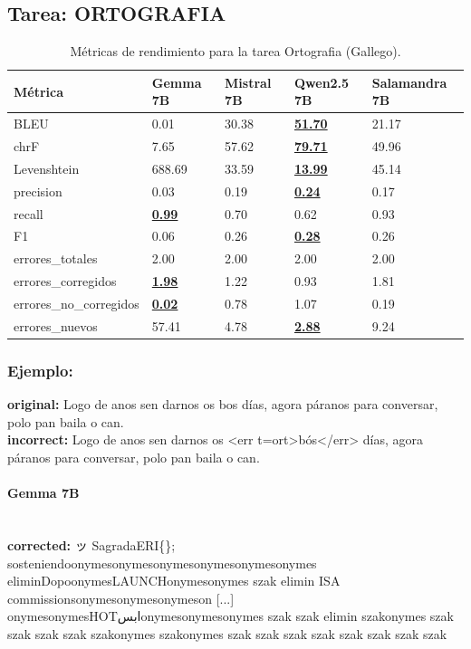 \subsection{Tarea: ORTOGRAFIA}\label{tarea-ortografia}
\begin{longtable}[]{@{}lllll@{}}
\toprule\noalign{}
Métrica & Gemma 7B & Mistral 7B & Qwen2.5 7B & Salamandra 7B \\
\midrule\noalign{}
\endhead
\bottomrule\noalign{}
\caption{Métricas de rendimiento para la tarea Ortografia (Gallego).}
\label{tab:metricas_ortografia_Gallego}
\endlastfoot
BLEU & 0.01 & 30.38 & \textbf{\underline{51.70}} & 21.17 \\
chrF & 7.65 & 57.62 & \textbf{\underline{79.71}} & 49.96 \\
Levenshtein & 688.69 & 33.59 & \textbf{\underline{13.99}} & 45.14 \\
precision & 0.03 & 0.19 & \textbf{\underline{0.24}} & 0.17 \\
recall & \textbf{\underline{0.99}} & 0.70 & 0.62 & 0.93 \\
F1 & 0.06 & 0.26 & \textbf{\underline{0.28}} & 0.26 \\
errores\_totales & 2.00 & 2.00 & 2.00 & 2.00 \\
errores\_corregidos & \textbf{\underline{1.98}} & 1.22 & 0.93 & 1.81 \\
errores\_no\_corregidos & \textbf{\underline{0.02}} & 0.78 & 1.07 & 0.19 \\
errores\_nuevos & 57.41 & 4.78 & \textbf{\underline{2.88}} & 9.24 \\
\end{longtable}

\subsubsection{Ejemplo:}
\textbf{original:} Logo de anos sen darnos os bos días, agora páranos para conversar, polo pan baila o can.\\
\textbf{incorrect:} Logo de anos sen darnos os {\textless}err t=ort{\textgreater}bós{\textless}/err{\textgreater} días, agora páranos para conversar, polo pan baila o can.

\paragraph{Gemma 7B}~\\
\textbf{corrected:} ッ SagradaERI\{\}; sosteniendoonymesonymesonymesonymesonymesonymes eliminDopoonymesLAUNCHonymesonymes szak elimin ISA commissionsonymesonymesonymeson [...] onymesonymesHOTابسonymesonymesonymes szak szak elimin szakonymes szak szak szak szak szakonymes szakonymes szak szak szak szak szak szak szak szak

